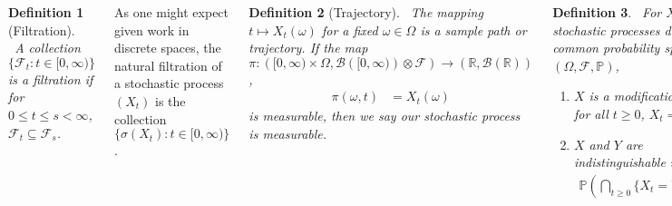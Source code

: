 \documentclass{tikzposter} %
\newcommand\rightopen[2]{\ensuremath{[#1,#2)}}
\newtheorem{definition}{Definition}
\begin{document}
\begin{columns}
{    \begin{definition}[Filtration]
    \ A collection $\{\mathcal{F}_{t} : t \in \rightopen{0}{\infty}\}$ is a filtration if for $0 \le t \le s < \infty$, $\mathcal{F}_{t} \subseteq \mathcal{F}_{s}$.
    \end{definition}
    \hphantom{}

    As one might expect given work in discrete spaces, the natural filtration of a stochastic process $(X_{t})$ is the collection $\{\sigma(X_{t}) : t \in \rightopen{0}{\infty}\}$. \\

    \begin{definition}[Trajectory]
      \ The mapping $t \mapsto X_{t}(\omega)$ for a fixed $\omega \in \Omega$ is a sample path or trajectory. If the map $\pi : (\rightopen{0}{\infty} \times \Omega, \mathcal{B}(\rightopen{0}{\infty}) \otimes \mathcal{F}) \to (\mathbb{R}, \mathcal{B}(\mathbb{R}))$,
      \begin{align*}
        \pi(\omega, t) &= X_{t}(\omega)
      \end{align*}
      is measurable, then we say our stochastic process is measurable.
    \end{definition}
    \hphantom{}

    \begin{definition}
    \ For $X$, $Y$ two stochastic processes defined on a common probability space $(\Omega, \mathcal{F}, \mathbb{P})$,
    \begin{enumerate}[label=\roman*.]
    \item $X$ is a modification of $Y$ if for all $t \ge 0$, $X_{t} = Y_{t}$ a.s..
    \item $X$ and $Y$ are indistinguishable if
            \begin{align*}
              \mathbb{P}\left(\bigcap_{t \ge 0} \{X_{t} = Y_{t}\}\right) = 1.
            \end{align*}
    \end{enumerate}
    \end{definition}
    \hphantom{}

    If $X$ and $Y$ are indistinguishable, then certainly they are modifications of one another. However, $X$ and $Y$ can be modifications of one another, and yet it is not the case that for almost every trajectory, $X_{t} = Y_{t}$ (consider defining $X = Y$ everywhere except at time $\tau \sim U[0,1]$). \\

    Indistinguishability is the exact analogy of a.s. equivalence when we consider stochastic processes as random functions $X : \Omega \to \mathcal{E}^{\mathcal{T}}$. This requires slightly more work however, because we then need a $\sigma$-algebra on $\mathcal{E}^{\mathcal{T}}$. \\

}
\end{columns}
\end{document}
